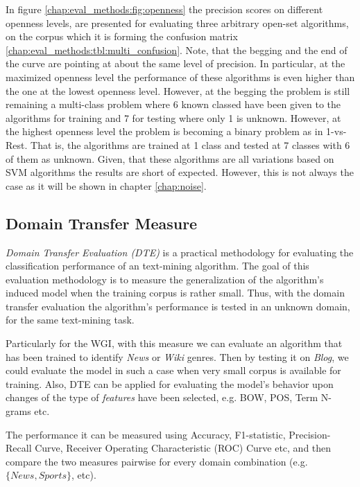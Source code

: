 In figure \ref{chap:eval_methods:fig:openness} the precision scores on different openness levels, are presented for evaluating three arbitrary open-set algorithms, on the corpus which it is forming the confusion matrix \ref{chap:eval_methods:tbl:multi_confusion}. Note, that the begging and the end of the curve are pointing at about the same level of precision. In particular, at the maximized openness level the performance of these algorithms is even higher than the one at the lowest openness level. However, at the begging the problem is still remaining a multi-class problem where 6 known classed have been given to the algorithms for training and 7 for testing where only 1 is unknown. However, at the highest openness level the problem is becoming a binary problem as in 1-vs-Rest. That is, the algorithms are trained at 1 class and tested at 7 classes with 6 of them as unknown. Given, that these algorithms are all variations based on SVM algorithms the results are short of expected. However, this is not always the case as it will be shown in chapter \ref{chap:noise}.


\subsection{Domain Transfer Measure}\label{chap:eval_methods:sec:domain_transfer_measure}

\textit{Domain Transfer Evaluation (DTE)} is a practical methodology for evaluating the classification performance of an text-mining algorithm. The goal of this evaluation methodology is to measure the generalization of the algorithm's induced model when the training corpus is rather small. Thus, with the domain transfer evaluation the algorithm's performance is tested in an unknown domain, for the same text-mining task. 

Particularly for the WGI, with this measure we can evaluate an algorithm that has been trained to identify \textit{News} or \textit{Wiki} genres. Then by testing it on \textit{Blog}, we could evaluate the model in such a case when very small corpus is available for training. Also, DTE can be applied for evaluating the model's behavior upon changes of the type of \textit{features} have been selected, e.g. BOW, POS, Term N-grams etc. 

The performance it can be measured using Accuracy, F1-statistic, Precision-Recall Curve, Receiver Operating Characteristic (ROC) Curve etc, and then compare the two measures pairwise for every domain combination (e.g. $\{News, Sports\}$, etc).

